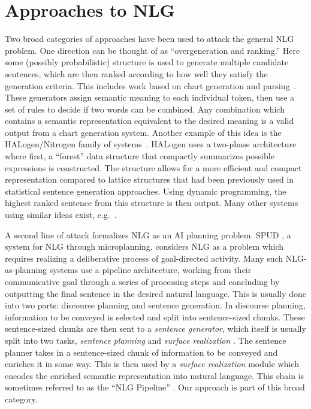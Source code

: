 \section{Approaches to NLG}
Two broad categories of
approaches have been used to attack the general NLG problem. One
direction can be thought of as ``overgeneration and ranking.'' Here
some (possibly probabilistic) structure is used to generate multiple
candidate sentences, which are then ranked according to how well they
satisfy the generation criteria. This includes work based on chart
generation and
parsing~\cite{shieber_uniform_1988,kay_chart_1996}. These generators
assign semantic meaning to each individual token, then use a set of
rules to decide if two words can be combined.  Any combination which
contains a semantic representation equivalent to the desired meaning 
is a valid output from a chart generation
system. Another example of this idea is the HALogen/Nitrogen
family of systems~\cite{langkilde_2002_halogen}. HALogen uses a two-phase
architecture where first, a ``forest'' data structure that compactly
summarizes possible expressions is constructed.  The structure allows
for a more efficient and compact representation compared to lattice
structures that had been previously used in statistical sentence
generation approaches.  Using dynamic programming, the highest ranked
sentence from this structure is then output. Many other systems using
similar ideas exist, e.g.~\cite{white_2003_ccg,lu2009natural}.

A second line of attack formalizes NLG as an AI planning problem.
SPUD \cite{stone_2003_spud}, a system for NLG through microplanning,
considers NLG as a problem which requires realizing a deliberative
process of goal-directed activity.  Many such NLG-as-planning systems
use a pipeline architecture, working from their communicative goal
through a series of processing steps and concluding by outputting the
final sentence in the desired natural language. This is usually done
into two parts:
discourse planning and sentence generation. In
discourse planning, information to be conveyed is selected and split
into sentence-sized chunks. These sentence-sized chunks are then sent
to a {\em sentence generator}, which itself is usually split into two
tasks, {\em sentence planning} and {\em surface realization}
\cite{koller_experiences_2011}.  The sentence planner takes in a
sentence-sized chunk of information to be conveyed and enriches it in
some way.  This is then used by a {\em surface realization}
module which encodes the enriched semantic representation into 
 natural language.  This chain is sometimes referred to as the
``NLG Pipeline'' \cite{reiter_building_2000}.  Our approach is
part of this broad category.

